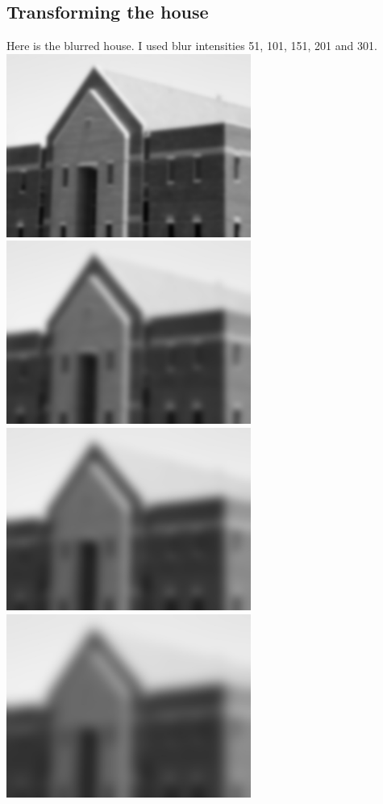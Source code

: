\documentclass{article}
\begin{document}
\subsection{Transforming the house}
Here is the blurred house. I used blur intensities 51, 101, 151, 201 and 301.
\includegraphics[height=60mm]{blurredhouse51}
\includegraphics[height=60mm]{blurredhouse101}
\includegraphics[height=60mm]{blurredhouse151}
\includegraphics[height=60mm]{blurredhouse201}
\end{document}
